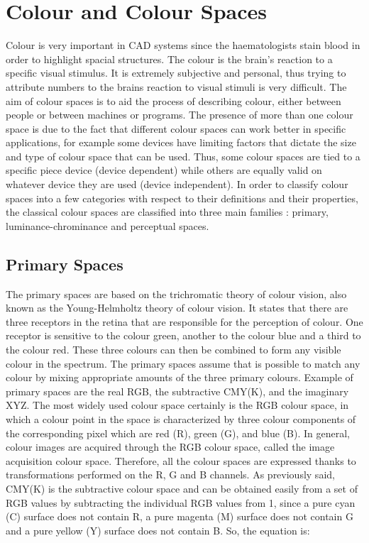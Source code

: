 \documentclass[final,a4paper,12pt,english]{UnicaPhdThesis3}
\begin{document}
	\section{Colour and Colour Spaces} %
	Colour is very important in CAD systems since the haematologists stain blood in order to highlight spacial structures. The colour is the brain's reaction to a specific visual stimulus. It is  extremely subjective and personal, thus trying to attribute numbers to the brains reaction to visual stimuli is very difficult. The aim of colour spaces is to aid the process of describing colour, either between people or between machines or programs. The presence of more than one colour space is due to the fact that different colour spaces can work better in specific applications, for example some devices have limiting factors that dictate the size and type of colour space that can be used. Thus, some colour spaces are tied to a specific piece device (device dependent) while others are equally valid on whatever device they are used (device independent). In order to classify colour spaces into a few categories with respect to their definitions and their properties, the classical colour spaces are classified into three main families \cite{Vandenbroucke, Busin}: primary, luminance-chrominance and perceptual spaces.
	
	\subsection{Primary Spaces}  %
	The primary spaces are based on the trichromatic theory of colour vision, also known as the Young-Helmholtz theory of colour vision. It states that there are three receptors in the retina that are responsible for the perception of colour. One receptor is sensitive to the colour green, another to the colour blue and a third to the colour red. These three colours can then be combined to form any visible colour in the spectrum.
	The primary spaces assume that is possible to match any colour by mixing appropriate amounts of the three primary colours. Example of primary spaces are the real RGB, the subtractive CMY(K), and the imaginary XYZ. The most widely used colour space certainly is the RGB colour space, in which a colour point in the space is characterized by three colour components of the corresponding pixel which are red (R), green (G), and blue (B). In general, colour images are acquired through the RGB colour space, called the image acquisition colour space. Therefore, all the colour spaces are expressed thanks to transformations performed on the R, G and B channels.
	As previously said, CMY(K) is the subtractive colour space and can be obtained easily from a set of RGB values by subtracting the individual RGB values from 1, since a pure cyan (C) surface does not contain R, a pure magenta (M) surface does not contain G and a pure yellow (Y) surface does not contain B. So, the equation is:
	
\end{document}
